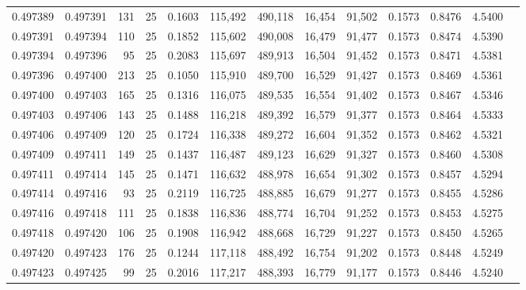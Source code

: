 \begin{tabular}{rrrrrrrrrrrrr}
0.497389 & 0.497391 & 131 &  25 &                                     0.1603 & 115,492 & 490,118 &  16,454 &  91,502 & 0.1573 & 0.8476 & 4.5400 \\
0.497391 & 0.497394 & 110 &  25 &                                     0.1852 & 115,602 & 490,008 &  16,479 &  91,477 & 0.1573 & 0.8474 & 4.5390 \\
0.497394 & 0.497396 &  95 &  25 &                                     0.2083 & 115,697 & 489,913 &  16,504 &  91,452 & 0.1573 & 0.8471 & 4.5381 \\
0.497396 & 0.497400 & 213 &  25 &                                     0.1050 & 115,910 & 489,700 &  16,529 &  91,427 & 0.1573 & 0.8469 & 4.5361 \\
0.497400 & 0.497403 & 165 &  25 &                                     0.1316 & 116,075 & 489,535 &  16,554 &  91,402 & 0.1573 & 0.8467 & 4.5346 \\
0.497403 & 0.497406 & 143 &  25 &                                     0.1488 & 116,218 & 489,392 &  16,579 &  91,377 & 0.1573 & 0.8464 & 4.5333 \\
0.497406 & 0.497409 & 120 &  25 &                                     0.1724 & 116,338 & 489,272 &  16,604 &  91,352 & 0.1573 & 0.8462 & 4.5321 \\
0.497409 & 0.497411 & 149 &  25 &                                     0.1437 & 116,487 & 489,123 &  16,629 &  91,327 & 0.1573 & 0.8460 & 4.5308 \\
0.497411 & 0.497414 & 145 &  25 &                                     0.1471 & 116,632 & 488,978 &  16,654 &  91,302 & 0.1573 & 0.8457 & 4.5294 \\
0.497414 & 0.497416 &  93 &  25 &                                     0.2119 & 116,725 & 488,885 &  16,679 &  91,277 & 0.1573 & 0.8455 & 4.5286 \\
0.497416 & 0.497418 & 111 &  25 &                                     0.1838 & 116,836 & 488,774 &  16,704 &  91,252 & 0.1573 & 0.8453 & 4.5275 \\
0.497418 & 0.497420 & 106 &  25 &                                     0.1908 & 116,942 & 488,668 &  16,729 &  91,227 & 0.1573 & 0.8450 & 4.5265 \\
0.497420 & 0.497423 & 176 &  25 &                                     0.1244 & 117,118 & 488,492 &  16,754 &  91,202 & 0.1573 & 0.8448 & 4.5249 \\
0.497423 & 0.497425 &  99 &  25 &                                     0.2016 & 117,217 & 488,393 &  16,779 &  91,177 & 0.1573 & 0.8446 & 4.5240 \\

\end{tabular}
